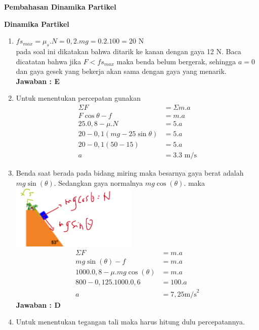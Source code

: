 \documentclass[10pt,a4paper]{extarticle}
\begin{document}
 \textbf{Pembahasan Dinamika Partikel} \phantom{ini nama siswa yang aaamengerjakan soal kuis ini }  

\begin{multicols*}{2}\raggedcolumns
\textbf{Dinamika Partikel}
\begin{enumerate}
\item $fs_{max}=\mu_s.N=0,2.mg=0.2.100=20$ N\\
pada  soal ini dikatakan bahwa ditarik ke kanan dengan gaya 12 N. Baca dicatatan bahwa jika $F<fs_{max}$ maka benda belum bergerak, sehingga $a=0$ dan gaya gesek yang bekerja akan sama dengan gaya yang menarik. \\
\textbf{Jawaban : E}

\item Untuk menentukan percepatan gunakan
\begin{align*}
\Sigma F &= \Sigma m. a\\
F\cos \theta  - f &= m.a\\
25.0,8 - \mu.N &=5.a\\
20 - 0,1 (mg - 25\sin \theta)&=5.a\\
20-0,1(50-15)&=5.a\\
a &=3.3 \text{ m/s}
\end{align*}

\item Benda saat berada pada bidang miring maka besarnya gaya berat adalah $mg\sin (\theta)$. Sedangkan gaya normalnya $mg \cos (\theta)$. maka\\
\includegraphics[width=6cm]{pic/68A3}
\begin{align*}
\Sigma F &= m.a\\
mg\sin (\theta)- f &= m.a\\
1000.0,8-\mu.mg\cos (\theta) &= m.a\\
800- 0,125 .1000.0,6&= 100.a\\
a&=7,25 \text{m/s}^2
\end{align*}
\textbf{Jawaban : D}

\item Untuk menentukan tegangan tali maka harus hitung dulu percepatannya. 


\end{enumerate}
\end{multicols*}
\end{document}
